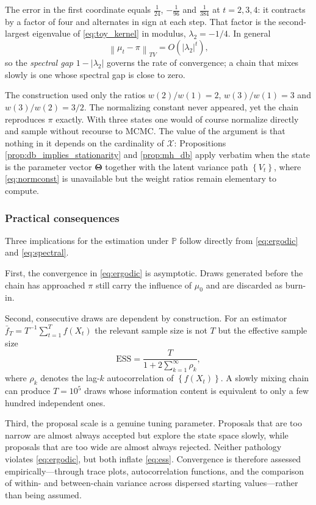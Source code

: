 \documentclass[11pt]{article}
\begin{document}
The error in the first coordinate equals $\tfrac{1}{24}$, $-\tfrac{1}{96}$ and
$\tfrac{1}{384}$ at $t=2,3,4$: it contracts by a factor of four and alternates
in sign at each step. That factor is the second-largest eigenvalue of
\eqref{eq:toy_kernel} in modulus, $\lambda_2=-1/4$. In general
\begin{equation}
    \left\|\mu_t-\pi\right\|_{TV}=O\left(\left|\lambda_2\right|^{t}\right),
    \label{eq:spectral}
\end{equation}
so the \emph{spectral gap} $1-\left|\lambda_2\right|$ governs the rate of
convergence; a chain that mixes slowly is one whose spectral gap is close to
zero.

The construction used only the ratios $w(2)/w(1)=2$, $w(3)/w(1)=3$ and
$w(3)/w(2)=3/2$. The normalizing constant never appeared, yet the chain
reproduces $\pi$ exactly. With three states one would of course normalize
directly and sample without recourse to MCMC. The value of the argument is that
nothing in it depends on the cardinality of $\mathcal{X}$: Propositions
\ref{prop:db_implies_stationarity} and \ref{prop:mh_db} apply verbatim when the
state is the parameter vector $\bm{\Theta}$ together with the latent variance
path $\left\{V_t\right\}$, where \eqref{eq:normconst} is unavailable but the
weight ratios remain elementary to compute.

\subsubsection*{Practical consequences}

Three implications for the estimation under $\mathbb{P}$ follow directly from
\eqref{eq:ergodic} and \eqref{eq:spectral}.

First, the convergence in \eqref{eq:ergodic} is asymptotic. Draws generated
before the chain has approached $\pi$ still carry the influence of $\mu_0$ and
are discarded as burn-in.

Second, consecutive draws are dependent by construction. For an estimator
$\bar{f}_T=T^{-1}\sum_{t=1}^{T}f\left(X_t\right)$ the relevant sample size is
not $T$ but the effective sample size
\begin{equation}
    \mathrm{ESS}=\frac{T}{1+2\sum_{k=1}^{\infty}\rho_k},
    \label{eq:ess}
\end{equation}
where $\rho_k$ denotes the lag-$k$ autocorrelation of
$\left\{f\left(X_t\right)\right\}$. A slowly mixing chain can produce $T=10^{5}$
draws whose information content is equivalent to only a few hundred independent
ones.

Third, the proposal scale is a genuine tuning parameter. Proposals that are too
narrow are almost always accepted but explore the state space slowly, while
proposals that are too wide are almost always rejected. Neither pathology
violates \eqref{eq:ergodic}, but both inflate \eqref{eq:ess}. Convergence is
therefore assessed empirically---through trace plots, autocorrelation functions,
and the comparison of within- and between-chain variance across dispersed
starting values---rather than being assumed.
\end{document}
